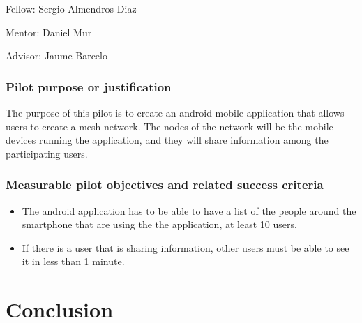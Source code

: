 \documentclass[draftclsnofoot,12pt,journal,onecolumn]{IEEEtran}
\begin{document}
Fellow: Sergio Almendros Diaz

Mentor: Daniel Mur

Advisor: Jaume Barcelo

\subsubsection{Pilot purpose or justification}
The purpose of this pilot is to create an android mobile application that allows users to create a mesh network.
The nodes of the network will be the mobile devices running the application, and they will share information among the participating users.

\subsubsection{Measurable pilot objectives and related success criteria}
\begin{itemize}
\item The android application has to be able to have a list of the people around the smartphone that are using the the application, at least 10 users.
\item If there is a user that is sharing information, other users must be able to see it in less than 1 minute.
\end{itemize}



\section{Conclusion}
\label{sec:conclusion}






%
\end{document}
